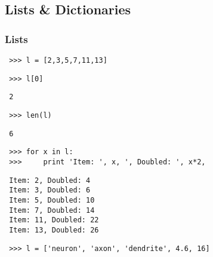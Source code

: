 \documentclass{beamer}
\begin{document}
\subsection{Lists \& Dictionaries}
\begin{frame}[fragile]
  
	\frametitle{Lists}

	  \begin{list}{\quad}{}
		  \small
		  \item<1-> \begin{verbatim} >>> l = [2,3,5,7,11,13] \end{verbatim}	
 		  \item<2-> \begin{verbatim} >>> l[0]	  \end{verbatim}	
		  \item<3-> \begin{verbatim} 2 \end{verbatim}	
 		  \item<4-> \begin{verbatim} >>> len(l)	  \end{verbatim}	
		  \item<5-> \begin{verbatim} 6 \end{verbatim}	
 		  \item<6-> \begin{verbatim} >>> for x in l:	  
 >>>     print 'Item: ', x, ', Doubled: ', x*2, \end{verbatim}	
		  \item<7-> \begin{verbatim} Item: 2, Doubled: 4
 Item: 3, Doubled: 6
 Item: 5, Doubled: 10
 Item: 7, Doubled: 14
 Item: 11, Doubled: 22
 Item: 13, Doubled: 26 \end{verbatim}	
		 \item<8-> \begin{verbatim} >>> l = ['neuron', 'axon', 'dendrite', 4.6, 16] \end{verbatim}	
	  \end{list}


\end{frame}
\end{document}
